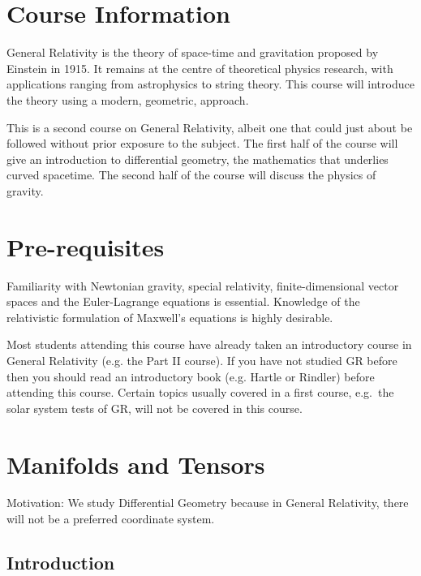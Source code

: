 \documentclass[a4paper,11pt]{article}
\begin{document}
	\maketitlepage

	\preliminaries

	\section*{Course Information}

	\noindent General Relativity is the theory of space-time and gravitation proposed by Einstein in 1915. It remains at the centre of theoretical physics research, with applications ranging from astrophysics to string theory. This course will introduce the theory using a modern, geometric, approach.
	
	\noindent This is a second course on General Relativity, albeit one that could just about be followed without prior exposure to the subject. The first half of the course will give an introduction to differential geometry, the mathematics that underlies curved spacetime. The second half of the course will discuss the physics of gravity.

	\section*{Pre-requisites}
	
	\noindent Familiarity with Newtonian gravity, special relativity, finite-dimensional vector spaces and the Euler-Lagrange equations is essential. Knowledge of the relativistic formulation of Maxwell’s equations is highly desirable.
	
	\noindent Most students attending this course have already taken an introductory course in General Relativity (e.g. the Part II course). If you have not studied GR before then you should read an introductory book (e.g. Hartle or Rindler) before attending this course. Certain topics usually covered in a first course, e.g.\ the solar system tests of GR, will not be covered in this course.

	\newpage
	\tableofcontents
	\newpage
	\maintext
	
	\section{Manifolds and Tensors}
	Motivation: We study Differential Geometry because in General Relativity, there will not be a preferred coordinate system.

	\subsection{Introduction}
\end{document}
